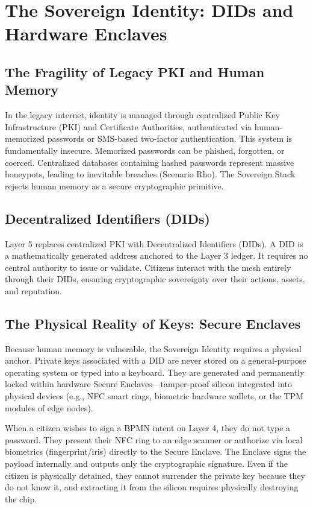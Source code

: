 \chapter{The Sovereign Identity: DIDs and Hardware Enclaves}

\section{The Fragility of Legacy PKI and Human Memory}
In the legacy internet, identity is managed through centralized Public Key Infrastructure (PKI) and Certificate Authorities, authenticated via human-memorized passwords or SMS-based two-factor authentication. This system is fundamentally insecure. Memorized passwords can be phished, forgotten, or coerced. Centralized databases containing hashed passwords represent massive honeypots, leading to inevitable breaches (Scenario Rho). The Sovereign Stack rejects human memory as a secure cryptographic primitive.

\section{Decentralized Identifiers (DIDs)}
Layer 5 replaces centralized PKI with Decentralized Identifiers (DIDs). A DID is a mathematically generated address anchored to the Layer 3 ledger. It requires no central authority to issue or validate. Citizens interact with the mesh entirely through their DIDs, ensuring cryptographic sovereignty over their actions, assets, and reputation.

\section{The Physical Reality of Keys: Secure Enclaves}
Because human memory is vulnerable, the Sovereign Identity requires a physical anchor. Private keys associated with a DID are never stored on a general-purpose operating system or typed into a keyboard. They are generated and permanently locked within hardware Secure Enclaves—tamper-proof silicon integrated into physical devices (e.g., NFC smart rings, biometric hardware wallets, or the TPM modules of edge nodes). 

When a citizen wishes to sign a BPMN intent on Layer 4, they do not type a password. They present their NFC ring to an edge scanner or authorize via local biometrics (fingerprint/iris) directly to the Secure Enclave. The Enclave signs the payload internally and outputs only the cryptographic signature. Even if the citizen is physically detained, they cannot surrender the private key because they do not know it, and extracting it from the silicon requires physically destroying the chip.

